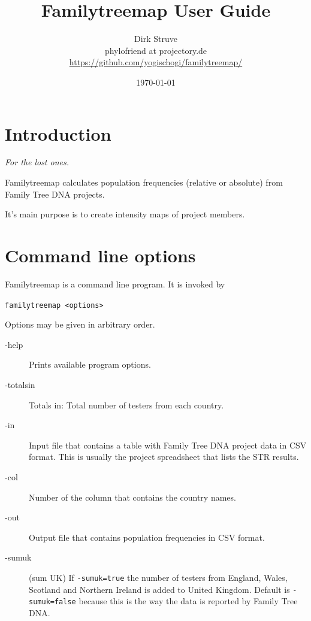 \documentclass[12pt,a4paper]{article}
\begin{document}
\title{Familytreemap User Guide}
\author{Dirk Struve\\
phylofriend at projectory.de\\
\href{https://github.com/yogischogi/familytreemap/}{https://github.com/yogischogi/familytreemap/}}
\date{\today}
\maketitle
\tableofcontents


\section{Introduction}

\hfill {\sl For the lost ones.}
\vspace{1em}

\noindent
Familytreemap calculates population frequencies
(relative or absolute) from Family Tree DNA projects.

It's main purpose is to create intensity maps of project members.


\section{Command line options}

Familytreemap is a command line program. It is invoked by

\vspace{1em}
\noindent\texttt{familytreemap <options>}

\vspace{1em}
\noindent Options may be given in arbitrary order.

\begin{description}
\item[-help] Prints available program options.
\item[-totalsin] Totals in: Total number of testers from each country.
\item[-in] Input file that contains a table with Family Tree DNA
  project data in CSV format. This is usually the project spreadsheet
  that lists the STR results.
\item[-col] Number of the column that contains the country names.
\item[-out] Output file that contains population frequencies in
  CSV format.
\item[-sumuk] (sum UK) If \texttt{-sumuk=true} the number of
  testers from England, Wales, Scotland and Northern Ireland
  is added to United Kingdom. Default is \texttt{-sumuk=false}
  because this is the way the data is reported by Family Tree DNA.
\end{description}
\end{document}
